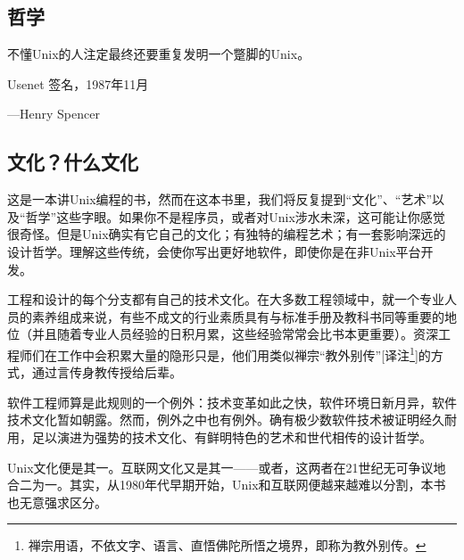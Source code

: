 \documentclass[11pt,oneside]{book}
\begin{document}
\frontmatter   

\author{Eric S. Raymond}
\titleLC


\setcounter{tocdepth}{2}    
\tableofcontents

\begin{common-format}
\mainmatter 

\chapter{哲学}

\begin{flushright}
\begin{notecard}[red!30]
不懂Unix的人注定最终还要重复发明一个蹩脚的Unix。

Usenet 签名，1987年11月

{\hfill —Henry Spencer}
\end{notecard}
\end{flushright}


\section{文化？什么文化}
这是一本讲Unix编程的书，然而在这本书里，我们将反复提到“文化”、“艺术”以及“哲学”这些字眼。如果你不是程序员，或者对Unix涉水未深，这可能让你感觉很奇怪。但是Unix确实有它自己的文化；有独特的编程艺术；有一套影响深远的设计哲学。理解这些传统，会使你写出更好地软件，即使你是在非Unix平台开发。

工程和设计的每个分支都有自己的技术文化。在大多数工程领域中，就一个专业人员的素养组成来说，有些不成文的行业素质具有与标准手册及教科书同等重要的地位（并且随着专业人员经验的日积月累，这些经验常常会比书本更重要）。资深工程师们在工作中会积累大量的隐形只是，他们用类似禅宗“教外别传”[译注\footnote{禅宗用语，不依文字、语言、直悟佛陀所悟之境界，即称为教外别传。}]的方式，通过言传身教传授给后辈。

软件工程师算是此规则的一个例外：技术变革如此之快，软件环境日新月异，软件技术文化暂如朝露。然而，例外之中也有例外。确有极少数软件技术被证明经久耐用，足以演进为强势的技术文化、有鲜明特色的艺术和世代相传的设计哲学。

Unix文化便是其一。互联网文化又是其一——或者，这两者在21世纪无可争议地合二为一。其实，从1980年代早期开始，Unix和互联网便越来越难以分割，本书也无意强求区分。



\end{common-format}
\end{document}
